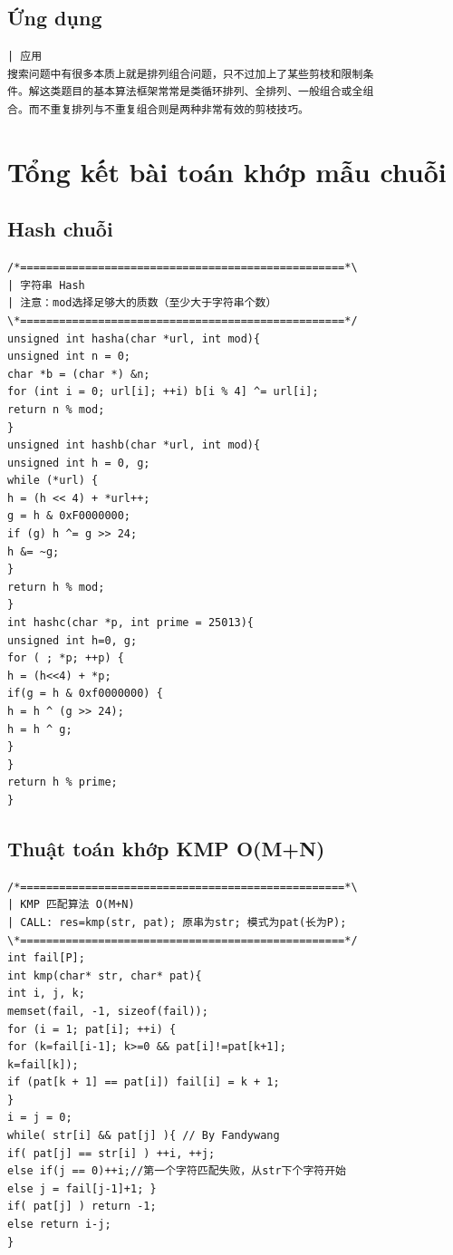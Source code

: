\documentclass[11pt]{article}
\begin{document}
\subsection{Ứng dụng}

\begingroup
\scriptsize
\begin{verbatim}
| 应用
搜索问题中有很多本质上就是排列组合问题，只不过加上了某些剪枝和限制条
件。解这类题目的基本算法框架常常是类循环排列、全排列、一般组合或全组
合。而不重复排列与不重复组合则是两种非常有效的剪枝技巧。
\end{verbatim}
\endgroup

\section{Tổng kết bài toán khớp mẫu chuỗi}

\subsection{Hash chuỗi}

\begingroup
\scriptsize
\begin{verbatim}
/*==================================================*\
| 字符串 Hash
| 注意：mod选择足够大的质数（至少大于字符串个数）
\*==================================================*/
unsigned int hasha(char *url, int mod){
unsigned int n = 0;
char *b = (char *) &n;
for (int i = 0; url[i]; ++i) b[i % 4] ^= url[i];
return n % mod;
}
unsigned int hashb(char *url, int mod){
unsigned int h = 0, g;
while (*url) {
h = (h << 4) + *url++;
g = h & 0xF0000000;
if (g) h ^= g >> 24;
h &= ~g;
}
return h % mod;
}
int hashc(char *p, int prime = 25013){
unsigned int h=0, g;
for ( ; *p; ++p) {
h = (h<<4) + *p;
if(g = h & 0xf0000000) {
h = h ^ (g >> 24);
h = h ^ g;
}
}
return h % prime;
}
\end{verbatim}
\endgroup

\subsection{Thuật toán khớp KMP O(M+N)}

\begingroup
\scriptsize
\begin{verbatim}
/*==================================================*\
| KMP 匹配算法 O(M+N)
| CALL: res=kmp(str, pat); 原串为str; 模式为pat(长为P);
\*==================================================*/
int fail[P];
int kmp(char* str, char* pat){
int i, j, k;
memset(fail, -1, sizeof(fail));
for (i = 1; pat[i]; ++i) {
for (k=fail[i-1]; k>=0 && pat[i]!=pat[k+1];
k=fail[k]);
if (pat[k + 1] == pat[i]) fail[i] = k + 1;
}
i = j = 0;
while( str[i] && pat[j] ){ // By Fandywang
if( pat[j] == str[i] ) ++i, ++j;
else if(j == 0)++i;//第一个字符匹配失败，从str下个字符开始
else j = fail[j-1]+1; }
if( pat[j] ) return -1;
else return i-j;
}
\end{verbatim}
\endgroup
\end{document}
